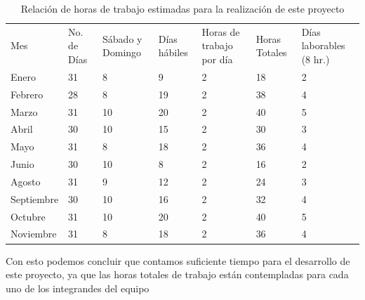 \documentclass[12pt, a4paper, titlepage]{report}
\begin{document}
    	    \begin{table}[H]
    			\begin{tabular}{|p{1.7cm}|p{1.6cm}||p{1.6cm}||p{1.6cm}||p{1.6cm}|p{1.6cm}|p{1.6cm|}}
    				\hline
    				\rowcolor{guindapoli}
    				\multicolumn{7}{|c|}{\textbf{\textcolor{white}{Horas a trabajar en el desarrollo del proyecto}}}\\
    				\hline
    				\rowcolor{azulfuerte}Mes & No. de Días & Sábado y Domingo & Días h\'abiles & Horas de trabajo por día & Horas Totales & Días laborables (8 hr.)\\
    				\hline
    				\cellcolor{azulclaro}Enero & 31 & 8 & 9 & 2 & 18 & 2\\ 
    				\hline
    				\cellcolor{azulclaro}Febrero & 28 & 8 & 19 & 2 & 38 & 4\\ 
    				\hline
    				\cellcolor{azulclaro}Marzo & 31 & 10 & 20 & 2 & 40 & 5\\ 
    				\hline
    				\cellcolor{azulclaro}Abril & 30 & 10 & 15 & 2 & 30 & 3\\ 
    				\hline
    				\cellcolor{azulclaro}Mayo & 31 & 8 & 18 & 2 & 36 & 4\\
    				\hline
    				\cellcolor{azulclaro}Junio & 30 & 10 & 8 & 2 & 16 & 2\\
    				\hline
    				\cellcolor{azulclaro}Agosto & 31 & 9 & 12 & 2 & 24 & 3\\
    				\hline
    				\cellcolor{azulclaro}Septiembre & 30 & 10 & 16 & 2 & 32 & 4\\ 
    				\hline
    				\cellcolor{azulclaro}Octubre & 31 & 10 & 20 & 2 & 40 & 5\\ 
    				\hline
    				\cellcolor{azulclaro}Noviembre & 31 & 8 & 18 & 2 & 36 & 4\\ 
    				\hline
    			\end{tabular}
    		    \caption[Horas de trabajo]{Relación de horas de trabajo estimadas para la realización de este proyecto}
    		\end{table}
    	    Con esto podemos concluir que contamos suficiente tiempo para el desarrollo de este proyecto, ya que las horas totales de trabajo están contempladas para cada uno de los integrandes del equipo
    	    
\end{document}
